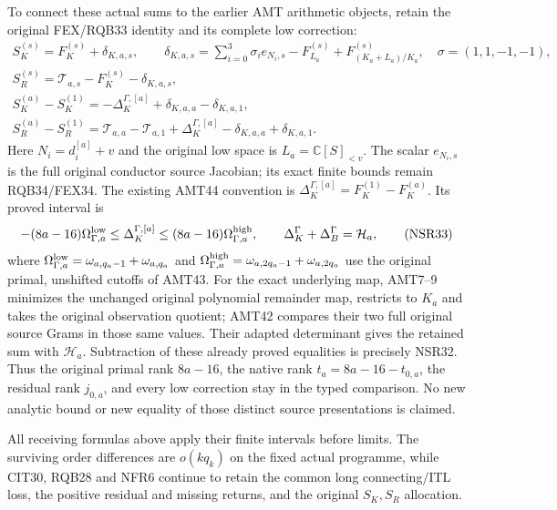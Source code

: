 \documentclass[11pt,a4paper]{article}
\begin{document}
To connect these actual sums to the earlier AMT
arithmetic objects, retain the original FEX/RQB33 identity
and its complete low correction:
\[
 \begin{gathered}
 S_K^{(s)}=F_K^{(s)}+\delta_{K,a,s},\qquad
 \delta_{K,a,s}=\sum_{i=0}^3\sigma_i e_{N_i,s}
                     -F_{L_a}^{(s)}+F_{(K_a+L_a)/K_a}^{(s)},
 \quad \sigma=(1,1,-1,-1),\\
 S_R^{(s)}=\mathcal T_{a,s}-F_K^{(s)}-\delta_{K,a,s},\\
 S_K^{(a)}-S_K^{(1)}
  =-\Delta_K^{\Gamma,[a]}+\delta_{K,a,a}-\delta_{K,a,1},\\
 S_R^{(a)}-S_R^{(1)}
  =\mathcal T_{a,a}-\mathcal T_{a,1}
        +\Delta_K^{\Gamma,[a]}-\delta_{K,a,a}+\delta_{K,a,1}.
 \end{gathered}\tag{NSR32}
\]
Here $N_i=d_i^{[a]}+v$ and the original low space is
$L_a=\mathbb C[S]_{<v}$. The scalar $e_{N_i,s}$ is the
full original conductor source Jacobian; its exact
finite bounds remain RQB34/FEX34.
The existing AMT44 convention is
$\Delta_K^{\Gamma,[a]}=F_K^{(1)}-F_K^{(a)}$.
Its proved interval is
\[
 -(8a-16)\Omega_{\Gamma,a}^{\rm low}
 \le\Delta_K^{\Gamma,[a]}
 \le(8a-16)\Omega_{\Gamma,a}^{\rm high},\qquad
 \Delta_K^\Gamma+\Delta_B^\Gamma=\mathcal H_a ,
 \tag{NSR33}
\]
where $\Omega_{\Gamma,a}^{\rm low}
=\omega_{a,q_a-1}+\omega_{a,q_a}$ and
$\Omega_{\Gamma,a}^{\rm high}
=\omega_{a,2q_a-1}+\omega_{a,2q_a}$ use the original
primal, unshifted cutoffs of AMT43.
For the exact underlying map, AMT7--9 minimizes the
unchanged original polynomial remainder map, restricts
to $K_a$ and takes the original observation quotient;
AMT42 compares their two full original source Grams
in those same values. Their adapted determinant gives
the retained sum with $\mathcal H_a$.
Subtraction of these already proved equalities is
precisely NSR32. Thus the original primal rank $8a-16$,
the native rank $t_a=8a-16-t_{0,a}$, the residual rank
$j_{0,a}$, and every low correction stay in the typed
comparison. No new analytic bound or new equality of
those distinct source presentations is claimed.

All receiving formulas above apply their finite intervals
before limits. The surviving order differences are
$o(kq_k)$ on the fixed actual programme, while CIT30,
RQB28 and NFR6 continue to retain the common long
connecting/ITL loss, the positive residual and missing
returns, and the original $S_K,S_R$ allocation.



\end{document}
